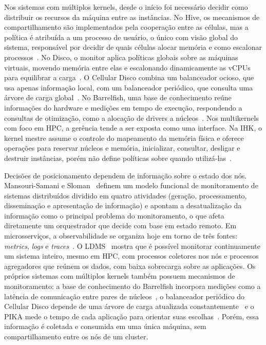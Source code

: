 \documentclass[12pt]{article}
\begin{document}
Nos sistemas com múltiplos kernels, desde o início foi necessário decidir como distribuir os recursos da máquina
entre as instâncias.
No Hive, os mecanismos de compartilhamento são implementados pela cooperação entre as células,
mas a política é atribuída a um processo de usuário, o único com visão global do sistema, responsável por decidir
de quais células alocar memória e como escalonar processos~\cite{chapin1995hive}.
No Disco, o monitor aplica
políticas globais sobre as máquinas virtuais, movendo memória entre elas e escalonando dinamicamente as vCPUs
para equilibrar a carga~\cite{bugnion1997disco}.
O Cellular Disco combina um balanceador ocioso, que usa apenas
informação local, com um balanceador periódico, que consulta uma árvore de carga global~\cite{govil2000cellular}.
No Barrelfish, uma base de conhecimento reúne informações do hardware e medições em tempo de execução, respondendo
a consultas de otimização, como a alocação de drivers a núcleos~\cite{baumann2009multikernel,schupbach2008diversity}.
Nos multikernels com foco em HPC, a gerência tende a ser exposta como uma interface.
Na IHK, o kernel mestre assume
o controle do mapeamento da memória física e oferece operações para reservar núcleos e memória, inicializar,
consultar, desligar e destruir instâncias, porém não define políticas sobre quando utilizá-las~\cite{shimosawa2014ihk}.

Decisões de posicionamento dependem de informação sobre o estado dos nós.
Mansouri-Samani e
Sloman~\cite{mansourisamani1993monitoring} definem um modelo funcional de monitoramento de sistemas distribuídos
dividido em quatro atividades (geração, processamento, disseminação e apresentação de informação) e apontam a
desatualização da informação como o principal problema do monitoramento, o que afeta diretamente um orquestrador que
decide com base em estado remoto.
Em microsserviços, a observabilidade se organiza hoje em torno de três fontes:
\textit{metrics}, \textit{logs} e \textit{traces}~\cite{faseeha2025observability}.
O LDMS~\cite{agelastos2014ldms} mostra que é
possível monitorar continuamente um sistema inteiro, mesmo em HPC, com processos coletores nos nós e processos
agregadores que reúnem os dados, com baixa sobrecarga sobre as aplicações.
Os próprios sistemas com múltiplos kernels
também possuem mecanismos de monitoramento: a base de conhecimento do Barrelfish incorpora medições como a latência de
comunicação entre pares de núcleos~\cite{baumann2009multikernel}, o balanceador periódico do Cellular Disco depende
de uma árvore de carga atualizada constantemente~\cite{govil2000cellular} e o PIKA mede o tempo de cada aplicação
para orientar suas escolhas~\cite{beckmann2014pika}.
Porém, essa informação é coletada e consumida em uma única máquina,
sem compartilhamento entre os nós de um cluster.
\end{document}
